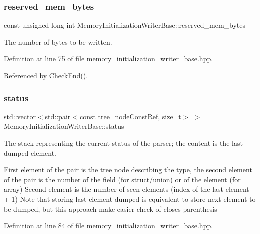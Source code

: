 \subsubsection{\texorpdfstring{reserved\+\_\+mem\+\_\+bytes}{reserved\_mem\_bytes}}
{\footnotesize\ttfamily const unsigned long int Memory\+Initialization\+Writer\+Base\+::reserved\+\_\+mem\+\_\+bytes\hspace{0.3cm}{\ttfamily [protected]}}



The number of bytes to be written. 



Definition at line 75 of file memory\+\_\+initialization\+\_\+writer\+\_\+base.\+hpp.



Referenced by Check\+End().

\mbox{\label{classMemoryInitializationWriterBase_a4cc071f08a35090c72bedcf1e847c9ce}} 
\subsubsection{\texorpdfstring{status}{status}}
{\footnotesize\ttfamily std\+::vector$<$std\+::pair$<$const \hyperlink{tree__node_8hpp_a3cf5d02292c940f3892425a5b5fdec3c}{tree\+\_\+node\+Const\+Ref}, \hyperlink{tutorial__fpt__2017_2intro_2sixth_2test_8c_a7c94ea6f8948649f8d181ae55911eeaf}{size\+\_\+t}$>$ $>$ Memory\+Initialization\+Writer\+Base\+::status\hspace{0.3cm}{\ttfamily [protected]}}



The stack representing the current status of the parser; the content is the last dumped element. 

First element of the pair is the tree node describing the type, the second element of the pair is the number of the field (for struct/union) or of the element (for array) Second element is the number of seen elements (index of the last element + 1) Note that storing last element dumped is equivalent to store next element to be dumped, but this approach make easier check of closes parenthesis 

Definition at line 84 of file memory\+\_\+initialization\+\_\+writer\+\_\+base.\+hpp.



